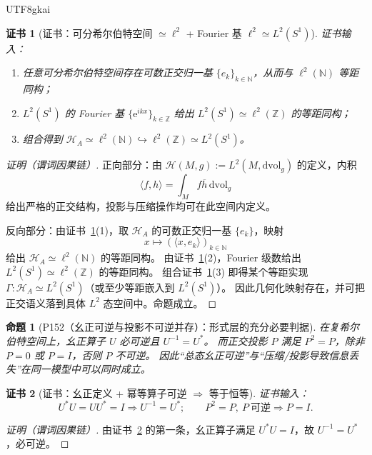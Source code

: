 \documentclass[12pt]{article}
\newtheorem{proposition}{命题}[section]
\newtheorem{Certificate}{证书}[section]
\begin{document}
\begin{CJK*}{UTF8}{gkai}
\begin{Certificate}[证书：可分希尔伯特空间 $\simeq \ell^2$ + Fourier 基 $\ell^2\simeq L^2(S^1)$]
\label{cert:P20}
证书输入：
\begin{enumerate}
\item 任意可分希尔伯特空间存在可数正交归一基 $\{e_k\}_{k\in\mathbb N}$，从而与 $\ell^2(\mathbb N)$ 等距同构；
\item $L^2(S^1)$ 的 Fourier 基 $\{\mathrm{e}^{ikx}\}_{k\in\mathbb Z}$ 给出 $L^2(S^1)\simeq \ell^2(\mathbb Z)$ 的等距同构；
\item 组合得到 $\mathcal H_A\simeq \ell^2(\mathbb N)\hookrightarrow \ell^2(\mathbb Z)\simeq L^2(S^1)$。
\end{enumerate}
\end{Certificate}

\begin{proof}[证明（谓词因果链）]
正向部分：由 $\mathcal H(M,g):=L^2(M,\mathrm{dvol}_g)$ 的定义，内积
\[
\langle f,h\rangle=\int_M f\overline{h}\,\mathrm{dvol}_g
\]
给出严格的正交结构，投影与压缩操作均可在此空间内定义。

反向部分：由证书~\ref{cert:P20}(1)，取 $\mathcal H_A$ 的可数正交归一基 $\{e_k\}$，映射
\[
x\longmapsto (\langle x,e_k\rangle)_{k\in\mathbb N}
\]
给出 $\mathcal H_A\simeq \ell^2(\mathbb N)$ 的等距同构。
由证书~\ref{cert:P20}(2)，Fourier 级数给出 $L^2(S^1)\simeq \ell^2(\mathbb Z)$ 的等距同构。
组合证书~\ref{cert:P20}(3) 即得某个等距实现 $\Gamma:\mathcal H_A\simeq L^2(S^1)$（或至少等距嵌入到 $L^2(S^1)$）。
因此几何化映射存在，并可把正交语义落到具体 $L^2$ 态空间中。命题成立。
\end{proof}

\begin{proposition}[P152（幺正可逆与投影不可逆并存）：形式层的充分必要判据]
\label{prop:P21}
在复希尔伯特空间上，幺正算子 $U$ 必可逆且 $U^{-1}=U^\ast$。
而正交投影 $P$ 满足 $P^2=P$，除非 $P=0$ 或 $P=I$，否则 $P$ 不可逆。
因此“总态幺正可逆”与“压缩/投影导致信息丢失”在同一模型中可以同时成立。
\end{proposition}

\begin{Certificate}[证书：幺正定义 + 幂等算子可逆 $\Rightarrow$ 等于恒等]
\label{cert:P21}
证书输入：
\[
U^\ast U=UU^\ast=I\Rightarrow U^{-1}=U^\ast;
\qquad
P^2=P,\ P\ \text{可逆}\Rightarrow P=I.
\]
\end{Certificate}

\begin{proof}[证明（谓词因果链）]
由证书~\ref{cert:P21} 的第一条，幺正算子满足 $U^\ast U=I$，故 $U^{-1}=U^\ast$，必可逆。


\end{proof}
\end{CJK*}
\end{document}
